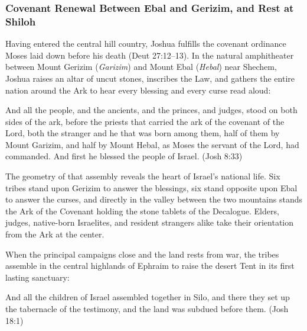 \subsubsection{Covenant Renewal Between Ebal and Gerizim, and Rest at Shiloh}

Having entered the central hill country, Joshua fulfills the covenant ordinance Moses laid down before his death (Deut 27:12--13). In the natural amphitheater between Mount Gerizim (\textit{Garizim}) and Mount Ebal (\textit{Hebal}) near Shechem, Joshua raises an altar of uncut stones, inscribes the Law, and gathers the entire nation around the Ark to hear every blessing and every curse read aloud:

\begin{scriptureblock}
And all the people, and the ancients, and the princes, and judges, stood on both sides of the ark, before the priests that carried the ark of the covenant of the Lord, both the stranger and he that was born among them, half of them by Mount Garizim, and half by Mount Hebal, as Moses the servant of the Lord, had commanded. And first he blessed the people of Israel. \textnormal{(Josh 8:33)}
\end{scriptureblock}

The geometry of that assembly reveals the heart of Israel's national life. Six tribes stand upon Gerizim to answer the blessings, six stand opposite upon Ebal to answer the curses, and directly in the valley between the two mountains stands the Ark of the Covenant holding the stone tablets of the Decalogue. Elders, judges, native-born Israelites, and resident strangers alike take their orientation from the Ark at the center.

When the principal campaigns close and the land rests from war, the tribes assemble in the central highlands of Ephraim to raise the desert Tent in its first lasting sanctuary:

\begin{scriptureblock}
And all the children of Israel assembled together in Silo, and there they set up the tabernacle of the testimony, and the land was subdued before them. \textnormal{(Josh 18:1)}
\end{scriptureblock}

